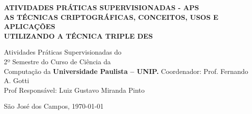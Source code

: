 \vspace*{2in} %
\begin{center}
{\large\bfseries ATIVIDADES PRÁTICAS SUPERVISIONADAS - APS }\\[0.4cm] %
{\bfseries AS TÉCNICAS CRIPTOGRÁFICAS, CONCEITOS, USOS E APLICAÇÕES\\UTILIZANDO A TÉCNICA TRIPLE DES }\\[0.2cm]
\vfill
\end{center}
\begin{raggedleft}
{Atividades Práticas Supervisionadas do\\2º Semestre do Curso de Ciência da\\Computação da \bfseries Universidade Paulista – UNIP.}
\vfill
Coordenador: Prof. Fernando A. Gotti\\Prof Responsável: Luiz Gustavo Miranda Pinto
\vfill
\end{raggedleft}
\begin{center}
{São José dos Campos, \today}\\[0.4cm] %
\end{center}
\newpage

\renewcommand*\contentsname{Sumário}

\tableofcontents

\vfill %



